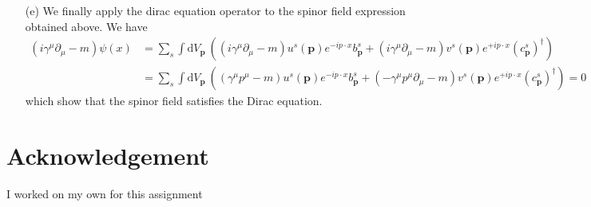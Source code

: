 \documentclass[10pt, a4paper]{article}
\begin{document}
\begin{enumerate}
  \item[(e)] We finally apply the dirac equation operator to the spinor field expression obtained above. We have 
  \begin{align*}
    (i \gamma^\mu \partial_\mu - m) \psi(x) &= \sum_s \int \text{d}V_\mathbf{p} \ \left((i \gamma^\mu \partial_\mu - m)u^s(\mathbf{p}) e^{-i p \cdot x} b_\mathbf{p}^s + (i \gamma^\mu \partial_\mu - m) v^s(\mathbf{p}) e^{+i p \cdot x} (c_\mathbf{p}^s)^\dagger\right)\\
    &=\sum_s \int \text{d}V_\mathbf{p} \ \left((\gamma^\mu p^\mu - m)u^s(\mathbf{p}) e^{-i p \cdot x} b_\mathbf{p}^s + (-\gamma^\mu p^\mu \partial_\mu - m) v^s(\mathbf{p}) e^{+i p \cdot x} (c_\mathbf{p}^s)^\dagger\right) = 0
  \end{align*}
  which show that the spinor field satisfies the Dirac equation. 
\end{enumerate}


\section{Acknowledgement}
I worked on my own for this assignment



\makereferences


\end{document}
